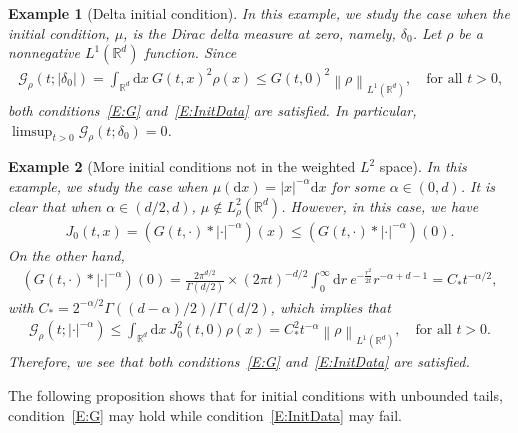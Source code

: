 \documentclass[sn-mathphys]{sn-jnl}%
\renewcommand{\R}{\mathbb{R}}
\newcommand{\Norm}[1]{\left\| #1 \right\|}
\newcommand{\ud}{\ensuremath{\mathrm{d}}}
\numberwithin{equation}{section}
\theoremstyle{thmstyleone}%
\theoremstyle{thmstyletwo}%
\newtheorem{example}{Example}[section]%
\theoremstyle{thmstylethree}%
\begin{document}
\begin{example}[Delta initial condition]\label{Ex:delta}
  In this example, we study the case when the initial condition, $\mu$, is the Dirac delta measure
  at zero, namely, $\delta_0$. Let $\rho$ be a nonnegative $L^1 (\R^d)$ function. Since
  \begin{align*}
    \mathcal{G}_\rho(t;\lvert \delta_0 \rvert)
    = \int_{\R^d} \ud x\: G(t,x)^2 \rho(x)
    \le G(t,0)^2 \Norm{\rho}_{L^1 (\R^d)},
    \quad \text{for all $t>0$,}
  \end{align*}
  both conditions~\eqref{E:G} and~\eqref{E:InitData} are satisfied. In particular, $\limsup_{t>0}
  \mathcal{G}_\rho(t;\delta_0) = 0$.
\end{example}


\begin{example}[More initial conditions not in the weighted $L^2$ space]\label{Ex:Riesz}
  In this example, we study the case when $\mu(\ud x) = \lvert x \rvert^{-\alpha}\ud x$ for some $\alpha\in
  (0,d)$. It is clear that when $\alpha\in (d/2,d)$, $\mu\not\in L_\rho^2 (\R^d)$. However, in this
  case, we have
  \begin{align*}
    J_0(t,x) = \left(G(t,\cdot)* \lvert \cdot \rvert^{-\alpha}\right)(x)
    \le \left(G(t,\cdot)* \lvert \cdot \rvert^{-\alpha}\right)(0).
  \end{align*}
  On the other hand,
  \begin{align*}
    \left(G(t,\cdot)* \lvert \cdot \rvert^{-\alpha}\right)(0)
    = \frac{2\pi^{d/2}}{\Gamma(d/2)}\times (2\pi t)^{-d/2} \int_0^\infty \ud r\: e^{-\frac{r^2}{2t}} r^{-\alpha + d-1} = C_* t^{-\alpha/2},
  \end{align*}
  with $C_* = 2^{-\alpha/2}\Gamma\left((d-\alpha)/2\right)/\Gamma(d/2)$, which implies that
  \begin{align*}
    \mathcal{G}_\rho\left(t;\lvert \cdot \rvert^{-\alpha}\right)
    \le \int_{\R^d} \ud x\: J_0^2 (t,0) \rho(x)
    = C_*^2 t^{-\alpha} \Norm{\rho}_{L^1 (\R^d)},
    \quad \text{for all $t>0$.}
  \end{align*}
  Therefore, we see that both conditions~\eqref{E:G} and~\eqref{E:InitData} are satisfied.
\end{example}

The following proposition shows that for initial conditions with unbounded tails,
condition~\eqref{E:G} may hold while condition~\eqref{E:InitData} may fail.
\end{document}
